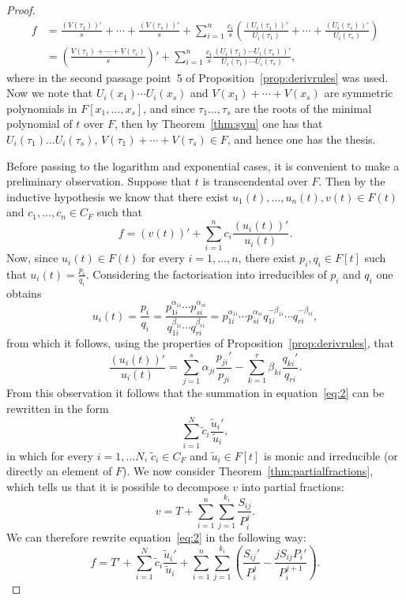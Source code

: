 \documentclass[11pt]{article}
\theoremstyle{plain}
\theoremstyle{definition}
\theoremstyle{remark}
\begin{document}
\begin{proof}
\begin{align*}
f &= \frac{(V(\tau_{1}))'}{s} + \cdots + \frac{(V(\tau_{s}))'}{s}
+ \sum_{i=1}^{n} \frac{c_{i}}{s}
\left( \frac{(U_{i}(\tau_{1}))'}{U_{i}(\tau_{1})} + \cdots
+ \frac{(U_{i}(\tau_{s}))'}{U_{i}(\tau_{s})} \right)\\
&= \left( \frac{V(\tau_{1}) + \cdots + V(\tau_{s})}{s} \right)'
+ \sum_{i=1}^{n} \frac{c_{i}}{s}
\frac{(U_{i}(\tau_{1}) \cdots U_{i}(\tau_{s}))'}{U_{i}(\tau_{1})
\cdots U_{i}(\tau_{s})},
\end{align*}
where in the second passage point~5 of
Proposition~\ref{prop:derivrules} was used. Now we note that
$U_{i}(x_{1}) \cdots U_{i}(x_{s})$ and $V(x_{1}) + \cdots + V(x_{s})$
are symmetric polynomials in $F[x_{1}, \ldots, x_{s}]$, and since
$\tau_{1} \ldots, \tau_{s}$ are the roots of the minimal polynomial of
$t$ over $F$, then by Theorem~\ref{thm:sym} one has that
$U_{i}(\tau_{1}) \ldots U_{i}(\tau_{s})$,
$V(\tau_{1}) + \cdots + V(\tau_{s}) \in F$, and hence one has the
thesis.

\medskip
\noindent
Before passing to the logarithm and exponential cases, it is convenient
to make a preliminary observation. Suppose that $t$ is transcendental
over $F$. Then by the inductive hypothesis we know that there exist
$u_{1}(t), \ldots, u_{n}(t), v(t) \in F(t)$ and
$c_{1}, \ldots, c_{n} \in C_{F}$ such that
\begin{equation}\label{eq:2}
f = (v(t))' + \sum_{i=1}^{n} c_{i} \frac{(u_{i}(t))'}{u_{i}(t)}.
\end{equation}
Now, since $u_{i}(t) \in F(t)$ for every $i = 1, \ldots, n$, there
exist $p_{i}, q_{i} \in F[t]$ such that $u_{i}(t) = \frac{p_{i}}{q_{i}}$.
Considering the factorisation into irreducibles of $p_{i}$ and $q_{i}$
one obtains
\[
u_{i}(t) = \frac{p_{i}}{q_{i}}
= \frac{p_{1i}^{\alpha_{1i}} \cdots p_{si}^{\alpha_{si}}}{q_{1i}^{\beta_{1i}}
\cdots q_{ri}^{\beta_{ri}}}
= p_{1i}^{\alpha_{1i}} \cdots p_{si}^{\alpha_{si}}
q_{1i}^{-\beta_{1i}} \cdots q_{ri}^{-\beta_{ri}},
\]
from which it follows, using the properties of
Proposition~\ref{prop:derivrules}, that
\[
\frac{(u_{i}(t))'}{u_{i}(t)}
= \sum_{j=1}^{s} \alpha_{ji} \frac{p_{ji}'}{p_{ji}}
- \sum_{k=1}^{r} \beta_{ki} \frac{q_{ki}'}{q_{ri}}.
\]
From this observation it follows that the summation in
equation~\eqref{eq:2} can be rewritten in the form
\[
\sum_{i=1}^{N} \tilde{c}_{i} \frac{\tilde{u}_{i}'}{\tilde{u}_{i}},
\]
in which for every $i = 1, \ldots N$, $\tilde{c}_{i} \in C_{F}$ and
$\tilde{u}_{i} \in F[t]$ is monic and irreducible (or directly an
element of $F$). We now consider Theorem~\ref{thm:partialfractions},
which tells us that it is possible to decompose $v$ into partial
fractions:
\[
v = T + \sum_{i=1}^{n} \sum_{j=1}^{k_{i}} \frac{S_{ij}}{P_{i}^{j}}.
\]
We can therefore rewrite equation~\eqref{eq:2} in the following way:
\begin{equation}\label{eq:3}
f = T' + \sum_{i=1}^{N} \tilde{c}_{i}
\frac{\tilde{u}_{i}'}{\tilde{u}_{i}}
+ \sum_{i=1}^{n} \sum_{j=1}^{k_{i}}
\left( \frac{S_{ij}'}{P_{i}^{j}}
- \frac{j S_{ij} P_{i}'}{P_{i}^{j+1}} \right).
\end{equation}


\end{proof}
\end{document}
